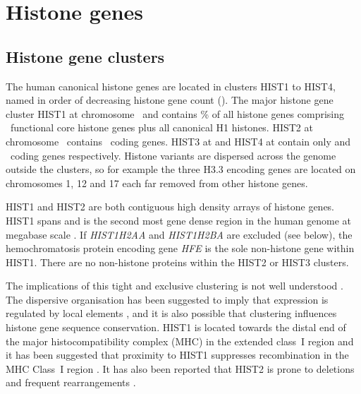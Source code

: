 \section{Histone genes}

  \subsection{Histone gene clusters}
    The human canonical histone genes are located in clusters HIST1 to HIST4, 
	named in order of decreasing histone gene count ().
	The major histone gene cluster HIST1 at chromosome~\HISTOneLocus{} and 
	contains \% of all histone genes 
	comprising \CodingGenesInHISTOne{}~functional core histone genes plus all canonical H1 histones. 
	HIST2 at chromosome~\HISTTwoLocus{} contains \CodingGenesInHISTTwo{}~coding genes. 
	HIST3 at \HISTThreeLocus{} and HIST4 at \HISTTFourLocus{} 
	contain only \CodingGenesInHISTThree{} and \CodingGenesInHISTFour{}~coding genes respectively. 
	Histone variants are dispersed across the genome outside the clusters, 
	so for example the three H3.3 encoding genes are located on chromosomes 1, 12 and 17 
	each far removed from other histone genes.

	HIST1 and HIST2 are both contiguous high density arrays of histone genes. 
	HIST1 spans \HISTOneSpan{} 
	and is the second most gene dense region in the human genome at megabase scale \citep{MHC-III-analysis}.
	If \textit{HIST1H2AA} and \textit{HIST1H2BA} are excluded (see below), 
	the hemochromatosis protein encoding gene \textit{HFE} is the sole non-histone gene within HIST1. 
	There are no non-histone proteins within the HIST2 or HIST3 clusters. 

	The implications of this tight and exclusive clustering is not well understood . 
	The dispersive organisation has been suggested to imply that expression is regulated by local elements \citep{close-regulators}, 
	and it is also possible that clustering influences histone gene sequence conservation. 
	HIST1 is located towards the distal end of the major histocompatibility complex (MHC) in the extended class~I region \citep{MHC-I-transcript, MHC-complete-sequencing-1999} 
	and it has been suggested that proximity to HIST1 suppresses recombination in the MHC Class~I region \citep{MHC-repressed-by-HIST}. 
	It has also been reported that HIST2 is prone to deletions and frequent rearrangements \citep{HISTTwo-prone-deletion-discovery, HISTTwo-prone-deletion-focus}. 

